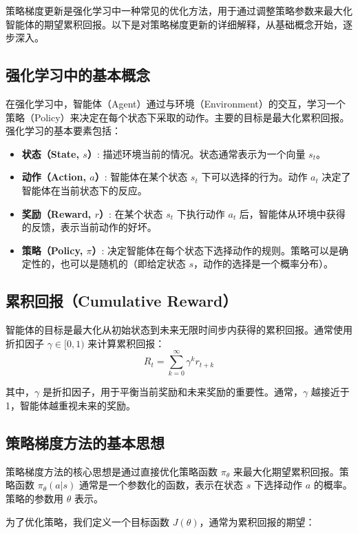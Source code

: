 \documentclass[twocolumn, 10pt]{article} %
\theoremstyle{remark}
\begin{document}
策略梯度更新是强化学习中一种常见的优化方法，用于通过调整策略参数来最大化智能体的期望累积回报。以下是对策略梯度更新的详细解释，从基础概念开始，逐步深入。

\subsection{强化学习中的基本概念}

在强化学习中，智能体（Agent）通过与环境（Environment）的交互，学习一个策略（Policy）来决定在每个状态下采取的动作。主要的目标是最大化累积回报。强化学习的基本要素包括：

\begin{itemize}
    \item \textbf{状态（State, \(s\)）}: 描述环境当前的情况。状态通常表示为一个向量 \(s_t\)。
    \item \textbf{动作（Action, \(a\)）}: 智能体在某个状态 \(s_t\) 下可以选择的行为。动作 \(a_t\) 决定了智能体在当前状态下的反应。
    \item \textbf{奖励（Reward, \(r\)）}: 在某个状态 \(s_t\) 下执行动作 \(a_t\) 后，智能体从环境中获得的反馈，表示当前动作的好坏。
    \item \textbf{策略（Policy, \(\pi\)）}: 决定智能体在每个状态下选择动作的规则。策略可以是确定性的，也可以是随机的（即给定状态 \(s\)，动作的选择是一个概率分布）。
\end{itemize}

\subsection{累积回报（Cumulative Reward）}

智能体的目标是最大化从初始状态到未来无限时间步内获得的累积回报。通常使用折扣因子 \( \gamma \in [0, 1) \) 来计算累积回报：
\[
R_t = \sum_{k=0}^{\infty} \gamma^k r_{t+k}
\]

\noindent 其中，\( \gamma \) 是折扣因子，用于平衡当前奖励和未来奖励的重要性。通常，\( \gamma \) 越接近于 1，智能体越重视未来的奖励。

\subsection{策略梯度方法的基本思想}

策略梯度方法的核心思想是通过直接优化策略函数 \( \pi_\theta \) 来最大化期望累积回报。策略函数 \( \pi_\theta(a | s) \) 通常是一个参数化的函数，表示在状态 \( s \) 下选择动作 \( a \) 的概率。策略的参数用 \( \theta \) 表示。

为了优化策略，我们定义一个目标函数 \( J(\theta) \)，通常为累积回报的期望：
\end{document}
